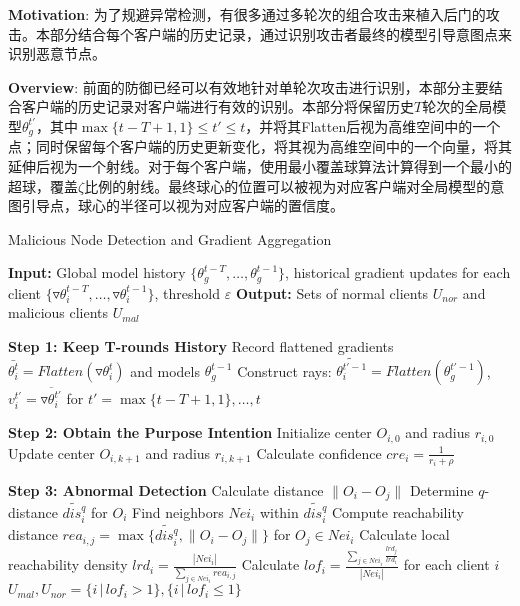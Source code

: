 \documentclass[lettersize,journal]{IEEEtran}
\begin{document}
\textbf{Motivation}: 为了规避异常检测，有很多通过多轮次的组合攻击来植入后门的攻击。本部分结合每个客户端的历史记录，通过识别攻击者最终的模型引导意图点来识别恶意节点。

\textbf{Overview}: 前面的防御已经可以有效地针对单轮次攻击进行识别，本部分主要结合客户端的历史记录对客户端进行有效的识别。本部分将保留历史$T$轮次的全局模型$\theta_g^{t'}$，其中$\max\{t-T+1, 1\}\leq  t'\leq t$，并将其Flatten后视为高维空间中的一个点；同时保留每个客户端的历史更新变化，将其视为高维空间中的一个向量，将其延伸后视为一个射线。对于每个客户端，使用最小覆盖球算法计算得到一个最小的超球，覆盖$\zeta$比例的射线。最终球心的位置可以被视为对应客户端对全局模型的意图引导点，球心的半径可以视为对应客户端的置信度。

\begin{algorithm}
\caption{Malicious Node Detection and Gradient Aggregation}
\label{alg:malicious-node-detection-history}
\begin{algorithmic}[1]
\State \textbf{Input:} Global model history $\{\theta_g^{t-T}, \dots, \theta_g^{t-1}\}$, historical gradient updates for each client $\{\triangledown \theta_{i}^{t-T}, \dots, \triangledown \theta_{i}^{t-1}\}$, threshold $\varepsilon$
\State \textbf{Output:} Sets of normal clients $U_{nor}$ and malicious clients $U_{mal}$

\State \textbf{Step 1: Keep T-rounds History}
    \State Record flattened gradients $\bar{\theta_i^t} = Flatten(\triangledown \theta_{i}^t)$ and models $\theta_g^{t-1}$
    \State Construct rays: $\widetilde{\theta_{i}^{t'-1}} = Flatten(\theta_g^{t'-1})$, ${v}_{i}^{t'} = \overline{\triangledown\theta_{i}^{t'}}$ for $t' = \max\{t-T+1, 1\}, \ldots, t$
\EndFor

\State \textbf{Step 2: Obtain the Purpose Intention}
    \State Initialize center $O_{i,0}$ and radius $r_{i,0}$
        \State Update center $O_{i,k+1}$ and radius $r_{i,k+1}$
    \EndWhile
    \State Calculate confidence $cre_i = \frac{1}{r_i + \rho}$
\EndFor

\State \textbf{Step 3: Abnormal Detection}
        \State Calculate distance $\|O_i - O_j\|$
    \EndFor
    \State Determine $q$-distance $\widetilde{dis_i^q}$ for $O_i$
    \State Find neighbors $Nei_i$ within $\widetilde{dis_i^q}$
    \State Compute reachability distance $rea_{i,j} = \max\{\widetilde{dis_i^q}, \|O_i - O_j\|\}$ for $O_j \in Nei_i$
    \State Calculate local reachability density $lrd_i = \frac{|Nei_i|}{\sum_{j \in Nei_i} rea_{i,j}}$
\EndFor
\State Calculate $lof_i = \frac{\sum_{j \in Nei_i} \frac{lrd_j}{lrd_i}}{|Nei_i|}$ for each client $i$
\State $U_{mal}, U_{nor} = \{i \,|\, lof_i > 1\}, \{i \,|\, lof_i \leq 1\}$


\end{algorithmic}
\end{algorithm}
\end{document}
